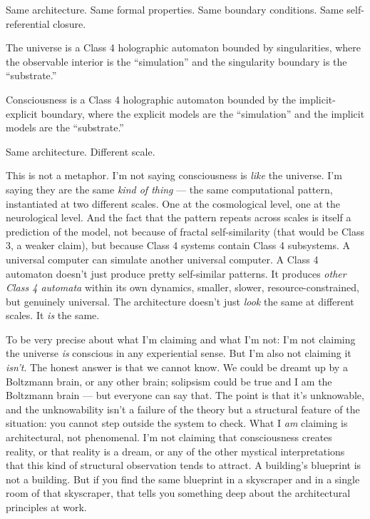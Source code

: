 \documentclass[11pt, twoside, openright]{book}
\begin{document}
Same architecture. Same formal properties. Same boundary conditions. Same self-referential closure.

The universe is a Class 4 holographic automaton bounded by singularities, where the observable interior is the ``simulation'' and the singularity boundary is the ``substrate.''

Consciousness is a Class 4 holographic automaton bounded by the implicit-explicit boundary, where the explicit models are the ``simulation'' and the implicit models are the ``substrate.''

Same architecture. Different scale.

This is not a metaphor. I'm not saying consciousness is \textit{like} the universe. I'm saying they are the same \textit{kind of thing} --- the same computational pattern, instantiated at two different scales. One at the cosmological level, one at the neurological level. And the fact that the pattern repeats across scales is itself a prediction of the model, not because of fractal self-similarity (that would be Class 3, a weaker claim), but because Class 4 systems contain Class 4 subsystems. A universal computer can simulate another universal computer. A Class 4 automaton doesn't just produce pretty self-similar patterns. It produces \textit{other Class 4 automata} within its own dynamics, smaller, slower, resource-constrained, but genuinely universal. The architecture doesn't just \textit{look} the same at different scales. It \textit{is} the same.

To be very precise about what I'm claiming and what I'm not: I'm not claiming the universe \textit{is} conscious in any experiential sense. But I'm also not claiming it \textit{isn't}. The honest answer is that we cannot know. We could be dreamt up by a Boltzmann brain, or any other brain; solipsism could be true and I am the Boltzmann brain --- but everyone can say that. The point is that it's unknowable, and the unknowability isn't a failure of the theory but a structural feature of the situation: you cannot step outside the system to check. What I \textit{am} claiming is architectural, not phenomenal. I'm not claiming that consciousness creates reality, or that reality is a dream, or any of the other mystical interpretations that this kind of structural observation tends to attract. A building's blueprint is not a building. But if you find the same blueprint in a skyscraper and in a single room of that skyscraper, that tells you something deep about the architectural principles at work.
\end{document}
